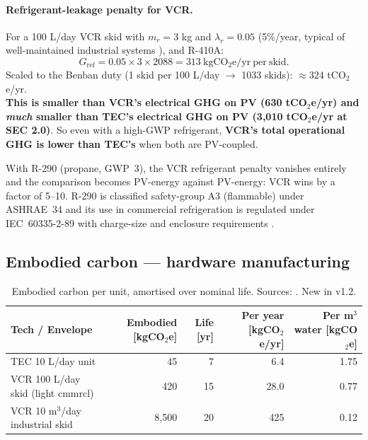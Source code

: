 \documentclass[11pt,a4paper]{article}
\begin{document}
\paragraph{Refrigerant-leakage penalty for VCR.} For a 100 L/day VCR skid with $m_r=3$ kg and $\lambda_r=0.05$ (5\%/year, typical of well-maintained industrial systems \citep{fgas_leakage_eu_assessment_2022,ashrae_leakage_survey_2019}), and R-410A:
\begin{equation}
G_{\mathrm{ref}} = 0.05\times 3\times 2088 = 313\ \mathrm{kgCO_2e/yr\ per\ skid}.
\end{equation}
Scaled to the Benban duty (1 skid per 100 L/day $\to$ 1033 skids): $\approx 324$ tCO$_2$e/yr.\\
\textbf{This is smaller than VCR's electrical GHG on PV (630 tCO$_2$e/yr) and \emph{much} smaller than TEC's electrical GHG on PV (3{,}010 tCO$_2$e/yr at SEC 2.0)}. So even with a high-GWP refrigerant, \textbf{VCR's total operational GHG is lower than TEC's} when both are PV-coupled.

With R-290 (propane, GWP~3), the VCR refrigerant penalty vanishes entirely and the comparison becomes PV-energy against PV-energy: VCR wins by a factor of 5--10. R-290 is classified safety-group A3 (flammable) under ASHRAE~34 and its use in commercial refrigeration is regulated under IEC~60335-2-89 with charge-size and enclosure requirements \citep{ashrae34_2022,iec_60335_2_89_2022}.

\subsection{Embodied carbon --- hardware manufacturing}
\begin{table}[h]
\centering\small
\caption{Embodied carbon per unit, amortised over nominal life. Sources: \citep{ipcc_ar6_wg3,embodied_electronics_2022}. New in v1.2.}
\label{tab:embodied}
\begin{tabular}{@{}lrrrr@{}}
\toprule
\textbf{Tech / Envelope} & \textbf{Embodied [kgCO$_2$e]} & \textbf{Life [yr]} & \textbf{Per year [kgCO$_2$e/yr]} & \textbf{Per m$^3$ water [kgCO$_2$e]}\\
\midrule
TEC 10 L/day unit                & 45   & 7  & 6.4   & 1.75 \\
VCR 100 L/day skid (light cmmrcl) & 420  & 15 & 28.0  & 0.77 \\
VCR 10 m$^3$/day industrial skid  & 8{,}500 & 20 & 425   & 0.12 \\
\bottomrule
\end{tabular}
\end{table}
\end{document}
